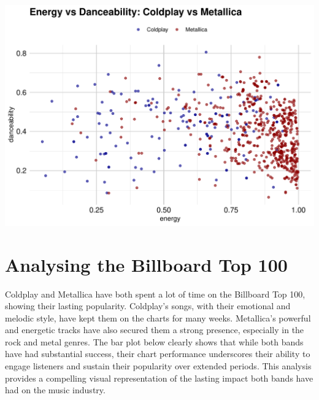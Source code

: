 \documentclass[12pt,preprint, authoryear]{elsarticle}
\let\origfigure\figure
\let\endorigfigure\endfigure
\renewenvironment{figure}[1][2] {
    \expandafter\origfigure\expandafter[H]
} {
    \endorigfigure
}
\numberwithin{equation}{section}
\numberwithin{figure}{section}
\numberwithin{table}{section}
\begin{document}
\begin{figure}

{\centering \includegraphics{README_files/figure-latex/unnamed-chunk-5-1} 

}

\caption{Energy versus Danceability\label{Figure5}}\label{fig:unnamed-chunk-5}
\end{figure}

\hypertarget{analysing-the-billboard-top-100}{%
\section{Analysing the Billboard Top
100}\label{analysing-the-billboard-top-100}}

Coldplay and Metallica have both spent a lot of time on the Billboard
Top 100, showing their lasting popularity. Coldplay's songs, with their
emotional and melodic style, have kept them on the charts for many
weeks. Metallica's powerful and energetic tracks have also secured them
a strong presence, especially in the rock and metal genres. The bar plot
below clearly shows that while both bands have had substantial success,
their chart performance underscores their ability to engage listeners
and sustain their popularity over extended periods. This analysis
provides a compelling visual representation of the lasting impact both
bands have had on the music industry.
\end{document}
